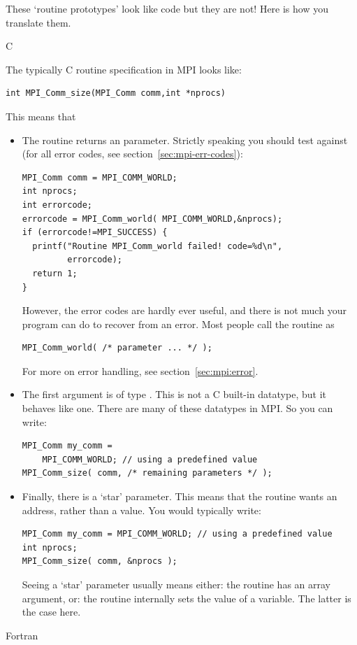 These `routine prototypes' look like code but they are not! Here is
how you translate them.

 {C}

The typically C routine specification in MPI looks like:
\begin{lstlisting}
int MPI_Comm_size(MPI_Comm comm,int *nprocs)
\end{lstlisting}
This means that
\begin{itemize}
\item The routine returns an  parameter. Strictly speaking you
  should test against  (for all error codes,
  see section~\ref{sec:mpi-err-codes}):
\begin{lstlisting}
MPI_Comm comm = MPI_COMM_WORLD;
int nprocs;
int errorcode;
errorcode = MPI_Comm_world( MPI_COMM_WORLD,&nprocs);
if (errorcode!=MPI_SUCCESS) {
  printf("Routine MPI_Comm_world failed! code=%d\n",
         errorcode);
  return 1;
}
\end{lstlisting}
  However, the error codes are hardly ever useful, and there is not
  much your program can do to recover from an error. Most people call
  the routine as
\begin{lstlisting}
MPI_Comm_world( /* parameter ... */ );
\end{lstlisting}
For more on error handling, see section~\ref{sec:mpi:error}.
\item The first argument is of type . This is not a C
  built-in datatype, but it behaves like one. There are many of these
   datatypes in MPI. So you can write:
\begin{lstlisting}
MPI_Comm my_comm =
    MPI_COMM_WORLD; // using a predefined value
MPI_Comm_size( comm, /* remaining parameters */ );
\end{lstlisting}
\item Finally, there is a `star' parameter. This means that the
  routine wants an address, rather than a value. You would typically write:
\begin{lstlisting}
MPI_Comm my_comm = MPI_COMM_WORLD; // using a predefined value
int nprocs;
MPI_Comm_size( comm, &nprocs );
\end{lstlisting}
  Seeing a `star' parameter usually means either: the routine has an
  array argument, or: the routine internally sets the value of a
  variable. The latter is the case here.
\end{itemize}

 {Fortran}


